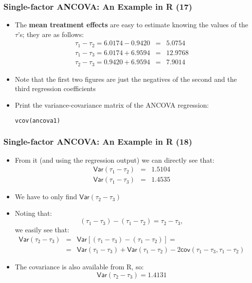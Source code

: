 \documentclass[10pt]{beamer}
\theoremstyle{definition}
\begin{document}
\begin{frame}[fragile]
\frametitle{Single-factor ANCOVA: An Example in R (17)}
\begin{itemize}
	\item The \textbf{mean treatment effects} are easy to estimate knowing the values of the $\tau$'s; they are as follows:
	\[
		\begin{array}{lcr}
			\tau_{1} - \tau_{2} = 6.0174 - 0.9420 & = & 5.0754\\
			\tau_{1} - \tau_{3} = 6.0174 + 6.9594 & = & 12.9768\\
			\tau_{2} - \tau_{3} = 0.9420 + 6.9594 & = & 7.9014
			
		\end{array}
	\]
	\item Note that the first two figures are just the negatives of the second and the third regression coefficients 
	\item Print the variance-covariance matrix of the ANCOVA regression:
	\begin{lstlisting}[style = rstyle, breaklines] 
	vcov(ancova1)
	\end{lstlisting}
\end{itemize}
\end{frame}

\begin{frame}[fragile]
\frametitle{Single-factor ANCOVA: An Example in R (18)}
\begin{itemize}
	\item From it (and using the regression output) we can directly see that:
	\[
		\begin{array}{lcl}
			\mathsf{Var}(\tau_{1} - \tau_{2}) & = & 1.5104\\
			\mathsf{Var}(\tau_{1} - \tau_{3}) & = & 1.4535
		\end{array}
	\]
	\item We have to only find $\mathsf{Var}(\tau_{2} - \tau_{3})$
	\item Noting that:
	\[
		(\tau_{1} - \tau_{3}) - (\tau_{1} - \tau_{2}) = \tau_{2} - \tau_{3},
	\]
	we easily see that:
	\[
		\begin{array}{lcl}
			\mathsf{Var}(\tau_{2} - \tau_{3}) & = & \mathsf{Var}[(\tau_{1} - \tau_{3}) - (\tau_{1} - \tau_{2})] = \\
			& = & \mathsf{Var}(\tau_{1} - \tau_{3}) + \mathsf{Var}(\tau_{1} - \tau_{2}) - 2\mathsf{cov}(\tau_{1} - \tau_{3},\tau_{1} - \tau_{2})
		\end{array}
	\]
	\item The covariance is also available from R, so:
	\[
		\mathsf{Var}(\tau_{2} - \tau_{3}) = 1.4131
	\]
\end{itemize}
\end{frame}
\end{document}
